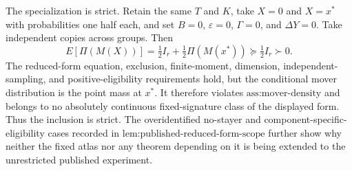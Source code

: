 The specialization is strict. Retain the same \(T\) and \(K\), take \(X=0\) and \(X=x^*\) with probabilities one half each, and set \(B=0\), \(\varepsilon=0\), \(\Gamma=0\), and \(\Delta Y=0\). Take independent copies across groups. Then
\[
E[\Pi(M(X))]
=\tfrac12I_r+\tfrac12\Pi(M(x^*))
\succeq\tfrac12I_r\succ0.
\]
The reduced-form equation, exclusion, finite-moment, dimension, independent-sampling, and positive-eligibility requirements hold, but the conditional mover distribution is the point mass at \(x^*\). It therefore violates \(\text{ass:mover-density}\) and belongs to no absolutely continuous fixed-signature class of the displayed form. Thus the inclusion is strict. The overidentified no-stayer and component-specific-eligibility cases recorded in \(\text{lem:published-reduced-form-scope}\) further show why neither the fixed atlas nor any theorem depending on it is being extended to the unrestricted published experiment.